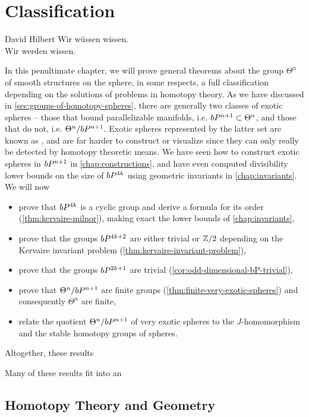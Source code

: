 \chapter{Classification}\label{chap:classification}

\begin{epigraph}{8.6em}{David Hilbert}
	Wir w\"ussen wissen.\\
	Wir werden wissen.
\end{epigraph}

In this penultimate chapter, we will prove general theorems about the group $\Theta^n$ of smooth structures on the sphere, in some respects, a full classification depending on the solutions of problems in homotopy theory. As we have discussed in \cref{sec:groups-of-homotopy-spheres}, there are generally two classes of exotic spheres -- those that bound parallelizable manifolds, i.e. $bP^{n+1}\subset \Theta^n$, and those that do not, i.e. $\Theta^n/bP^{n+1}$.
Exotic spheres represented by the latter set are known as , and are far harder to construct or visualize since they can only really be detected by homotopy theoretic means.
We have seen how to construct exotic spheres in $bP^{n+1}$ in \cref{chap:constructions}, and have even computed divisibility lower bounds on the size of $bP^{4k}$ using geometric invariants in \cref{chap:invariants}. We will now
\begin{itemize}
	\item prove that $bP^{4k}$ is a cyclic group and derive a formula for its order (\cref{thm:kervaire-milnor}), making exact the lower bounds of \cref{chap:invariants},
	\item prove that the groups $bP^{4k+2}$ are either trivial or $\mathbb{Z}/2$ depending on the Kervaire invariant problem (\cref{thm:kervaire-invariant-problem}),
	\item prove that the groups $bP^{2k+1}$ are trivial (\cref{cor:odd-dimensional-bP-trivial}),
	\item prove that $\Theta^n/bP^{n+1}$ are finite groups (\cref{thm:finite-very-exotic-spheres}) and consequently $\Theta^n$ are finite,
	\item relate the quotient $\Theta^n/bP^{n+1}$ of very exotic spheres to the $J$-homomorphism and the stable homotopy groups of spheres.
\end{itemize}
Altogether, these results

Many of these results fit into an 

\pagebreak
\section{Homotopy Theory and Geometry}


